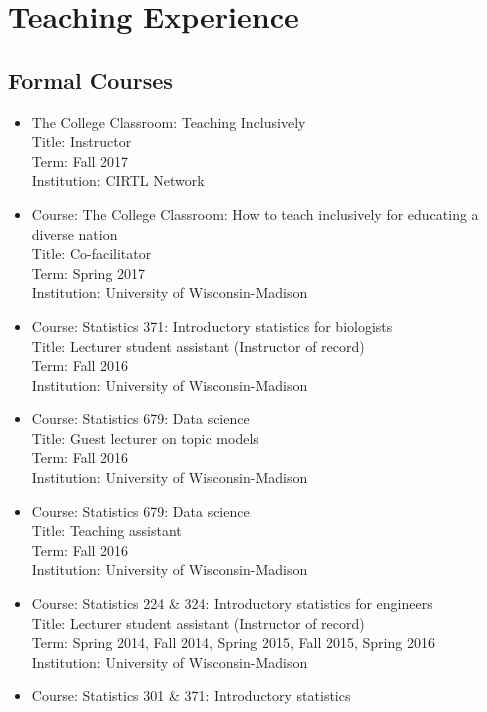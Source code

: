 \section*{Teaching Experience}

\subsection*{Formal Courses}
\begin{itemize}
\item The College Classroom: Teaching Inclusively\\
Title: Instructor\\
Term: Fall 2017\\
Institution: CIRTL Network
\item Course: The College Classroom: How to teach inclusively for educating a diverse nation \\
Title: Co-facilitator \\
Term: Spring 2017\\
Institution: University of Wisconsin-Madison
\item Course: Statistics 371: Introductory statistics for biologists\\
Title: Lecturer student assistant (Instructor of record)\\
Term: Fall 2016\\
Institution: University of Wisconsin-Madison
\item Course: Statistics 679: Data science\\
Title: Guest lecturer on topic models\\
Term: Fall 2016\\
Institution: University of Wisconsin-Madison
\item Course: Statistics 679: Data science\\
Title: Teaching assistant\\
Term: Fall 2016\\
Institution: University of Wisconsin-Madison
\item Course: Statistics 224 \& 324: Introductory statistics for engineers\\
Title: Lecturer student assistant (Instructor of record)\\
Term: Spring 2014, Fall 2014, Spring 2015, Fall 2015, Spring 2016\\
Institution: University of Wisconsin-Madison
\item Course: Statistics 301 \& 371: Introductory statistics\\

\end{itemize}
